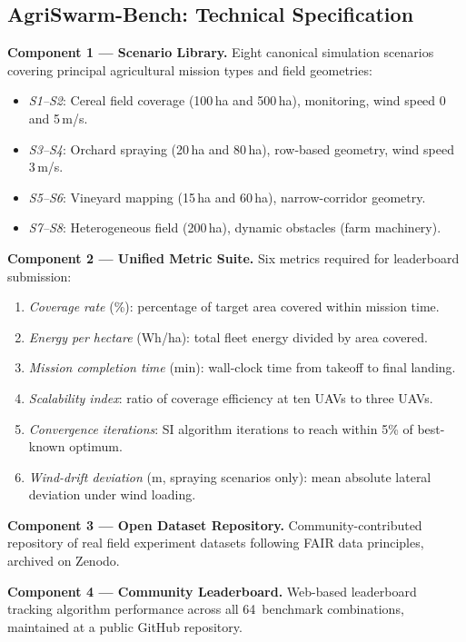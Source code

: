 \documentclass[review,3p]{elsarticle}
\begin{document}
\subsection{AgriSwarm-Bench: Technical Specification}

\textbf{Component 1 --- Scenario Library.} Eight canonical simulation scenarios
covering principal agricultural mission types and field geometries:
\begin{itemize}
  \item \textit{S1--S2}: Cereal field coverage (100\,ha and 500\,ha), monitoring, wind speed 0 and 5\,m/s.
  \item \textit{S3--S4}: Orchard spraying (20\,ha and 80\,ha), row-based geometry, wind speed 3\,m/s.
  \item \textit{S5--S6}: Vineyard mapping (15\,ha and 60\,ha), narrow-corridor geometry.
  \item \textit{S7--S8}: Heterogeneous field (200\,ha), dynamic obstacles (farm machinery).
\end{itemize}

\textbf{Component 2 --- Unified Metric Suite.} Six metrics required for leaderboard submission:
\begin{enumerate}
  \item \textit{Coverage rate} (\%): percentage of target area covered within mission time.
  \item \textit{Energy per hectare} (Wh/ha): total fleet energy divided by area covered.
  \item \textit{Mission completion time} (min): wall-clock time from takeoff to final landing.
  \item \textit{Scalability index}: ratio of coverage efficiency at ten UAVs to three UAVs.
  \item \textit{Convergence iterations}: SI algorithm iterations to reach within 5\% of best-known optimum.
  \item \textit{Wind-drift deviation} (m, spraying scenarios only): mean absolute lateral deviation under wind loading.
\end{enumerate}

\textbf{Component 3 --- Open Dataset Repository.} Community-contributed repository of real field experiment datasets following FAIR data principles, archived on Zenodo.

\textbf{Component 4 --- Community Leaderboard.} Web-based leaderboard tracking algorithm performance across all 64~benchmark combinations, maintained at a public GitHub repository.
\end{document}
